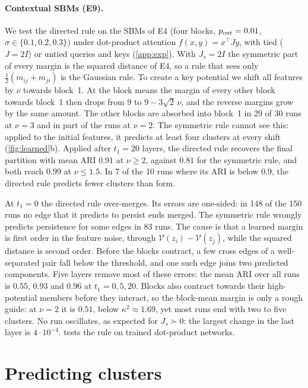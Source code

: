 \documentclass[10pt]{article}
\theoremstyle{definition}
\theoremstyle{remark}
\begin{document}
\paragraph{Contextual SBMs (E9).} We test the directed rule on the SBMs of E4 (four blocks, $p_{\rm out}=0.01$, $\sigma\in\{0.1,0.2,0.3\}$) under
dot-product attention $f(x,y)=x^\top Jy$, with tied ($J=2I$) or untied queries and keys (\cref{app:exp}). With $J_s=2I$ the symmetric part of
every margin is the squared distance of E4, so a rule that sees only $\frac12(m_{ij}+m_{ji})$ is the Gaussian rule. To create a key potential we
shift all features by $\nu$ towards block~1. At the block means the margin of every other block towards block~1 then drops from $9$ to
$9-3\sqrt2\,\nu$, and the reverse margins grow by the same amount. The other blocks are absorbed into block~1 in 29 of 30 runs at $\nu=3$ and in
part of the runs at $\nu=2$. The symmetric rule cannot see this: applied to the initial features, it predicts at least four clusters at every shift
(\cref{fig:learned}b). Applied after
$t_1=20$ layers, the directed rule recovers the final partition with mean ARI $0.91$ at $\nu\ge2$, against $0.81$ for the symmetric rule, and both
reach $0.99$ at $\nu\le1.5$. In 7 of the 10 runs where its ARI is below $0.9$, the directed rule predicts fewer clusters than form.

At $t_1=0$ the directed rule over-merges. Its errors are one-sided: in 148 of the 150 runs no edge that it predicts to persist ends merged.
The symmetric rule wrongly predicts persistence for some edges in 83 runs. The cause is that a learned margin is first order in the feature noise, through
$\mathcal V(z_i)-\mathcal V(z_j)$, while the squared distance is second order. Before the blocks contract, a few cross edges of a well-separated pair
fall below the threshold, and one such edge joins two predicted components. Five layers remove most of these errors: the mean ARI over all runs
is $0.55$, $0.93$ and $0.96$ at $t_1=0,5,20$. Blocks also contract towards their high-potential members before they interact, so the
block-mean margin is only a rough guide: at $\nu=2$ it is $0.51$, below $\kappa^2\approx1.69$, yet most runs end with two to five clusters. No run
oscillates, as expected for $J_s\succ0$: the largest change in the last layer is $4\cdot10^{-4}$.  tests the rule on trained
dot-product networks.

\section{Predicting clusters}\label{sec:prediction}
\end{document}
